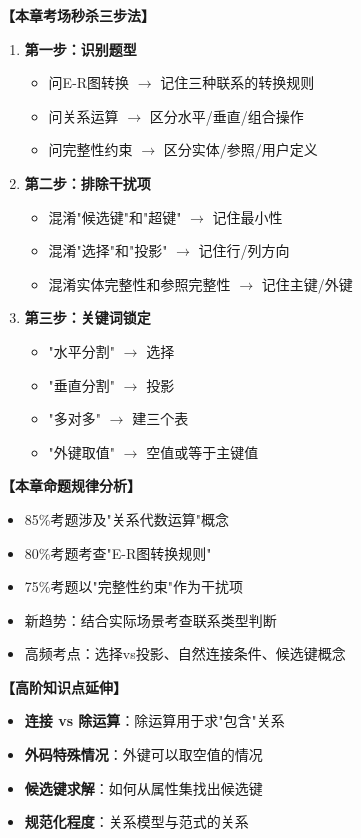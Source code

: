 \documentclass[12pt, a4paper]{article}
\newenvironment{bluebox}[1]{%
  \begin{trivlist}
  \item[\hskip\labelsep \textbf{#1}]
  \setlength{\parskip}{0.5ex}
  \setlength{\itemsep}{0.5ex}
}{%
  \end{trivlist}
}
\begin{document}
\begin{bluebox}{考场秒杀三步法}
	\textbf{【本章考场秒杀三步法】}

	\begin{enumerate}
		\item \textbf{第一步：识别题型}
		      \begin{itemize}
			      \item 问E-R图转换 $\rightarrow$ 记住三种联系的转换规则
			      \item 问关系运算 $\rightarrow$ 区分水平/垂直/组合操作
			      \item 问完整性约束 $\rightarrow$ 区分实体/参照/用户定义
		      \end{itemize}

		\item \textbf{第二步：排除干扰项}
		      \begin{itemize}
			      \item 混淆"候选键"和"超键" $\rightarrow$ 记住最小性
			      \item 混淆"选择"和"投影" $\rightarrow$ 记住行/列方向
			      \item 混淆实体完整性和参照完整性 $\rightarrow$ 记住主键/外键
		      \end{itemize}

		\item \textbf{第三步：关键词锁定}
		      \begin{itemize}
			      \item "水平分割" $\rightarrow$ 选择
			      \item "垂直分割" $\rightarrow$ 投影
			      \item "多对多" $\rightarrow$ 建三个表
			      \item "外键取值" $\rightarrow$ 空值或等于主键值
		      \end{itemize}
	\end{enumerate}
\end{bluebox}

\begin{bluebox}{近年真题规律}
	\textbf{【本章命题规律分析】}

	\begin{itemize}
		\item 85\%考题涉及"关系代数运算"概念
		\item 80\%考题考查"E-R图转换规则"
		\item 75\%考题以"完整性约束"作为干扰项
		\item 新趋势：结合实际场景考查联系类型判断
		\item 高频考点：选择vs投影、自然连接条件、候选键概念
	\end{itemize}
\end{bluebox}

\begin{bluebox}{高阶延伸（冲击满分）}
	\textbf{【高阶知识点延伸】}

	\begin{itemize}
		\item \textbf{连接 vs 除运算}：除运算用于求"包含"关系
		\item \textbf{外码特殊情况}：外键可以取空值的情况
		\item \textbf{候选键求解}：如何从属性集找出候选键
		\item \textbf{规范化程度}：关系模型与范式的关系
	\end{itemize}
\end{bluebox}
\end{document}
